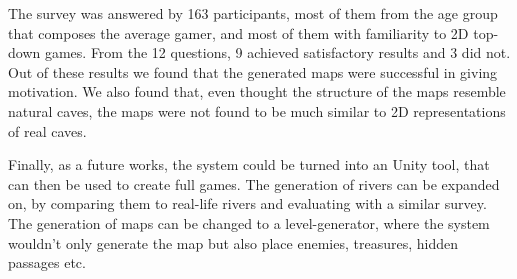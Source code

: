 The survey was answered by 163 participants, most of them from the age group that composes the average gamer, and most of them with familiarity to 2D top-down games. From the 12 questions, 9 achieved satisfactory results and 3 did not. Out of these results we found that the generated maps were successful in giving motivation. We also found that, even thought the structure of the maps resemble natural caves, the maps were not found to be much similar to 2D representations of real caves.

Finally, as a future works, the system could be turned into an Unity tool, that can then be used to create full games. The generation of rivers can be expanded on, by comparing them to real-life rivers and evaluating with a similar survey. The generation of maps can be changed to a level-generator, where the system wouldn't only generate the map but also place enemies, treasures, hidden passages etc.